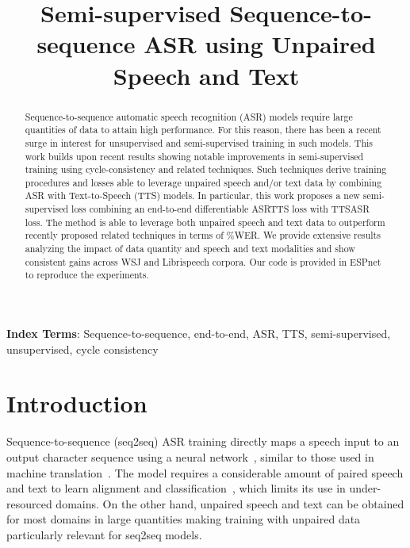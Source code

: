 \documentclass[a4paper]{article}
\title{Semi-supervised Sequence-to-sequence ASR using Unpaired Speech and Text}
\begin{document}
\maketitle
\begin{abstract}
Sequence-to-sequence automatic speech recognition (ASR) models require large quantities of data to attain high performance. For this reason, there has been a recent surge in interest for unsupervised and semi-supervised training in such models. This work builds upon recent results showing notable improvements in semi-supervised training using cycle-consistency and related techniques. Such techniques derive training procedures and losses able to leverage unpaired speech and/or text data by combining ASR with Text-to-Speech (TTS) models. In particular, this work proposes a new semi-supervised loss combining an end-to-end differentiable ASRTTS loss with TTSASR loss. The method is able to leverage both unpaired speech and text data to outperform recently proposed related techniques in terms of \%WER. We provide extensive results analyzing the impact of data quantity and speech and text modalities and show consistent gains across WSJ and Librispeech corpora. Our code is provided in ESPnet to reproduce the experiments.
\end{abstract}
\medskip
	
\noindent\textbf{Index Terms}:  Sequence-to-sequence, end-to-end, ASR, TTS, semi-supervised, unsupervised, cycle consistency

\section{Introduction}
Sequence-to-sequence (seq2seq) ASR training directly maps a speech input to an output character sequence using a neural network~\cite{graves2014towards,bahdanau2016end,chan2016LAS}, similar to those used in machine translation~\cite{bahdanau2014neural,sutskever2014sequence}. The model requires a considerable amount of paired speech and text to learn alignment and classification~\cite{amodei2016deep,prabhavalkar2017comparison}, which limits its use in under-resourced domains. On the other hand, unpaired speech and text can be obtained for most domains in large quantities making training with unpaired data particularly relevant for seq2seq models.
\end{document}
